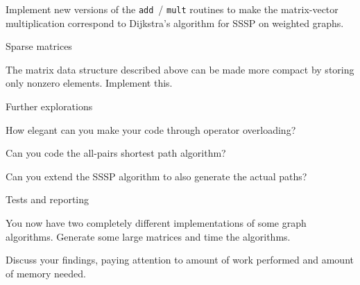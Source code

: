 \begin{exercise}
  Implement new versions of the  \lstinline{add}~/ \lstinline{mult} routines
  to make the matrix-vector multiplication correspond to Dijkstra's algorithm
  for \ac{SSSP} on weighted graphs.
\end{exercise}

 {Sparse matrices}

The matrix data structure described above can be made
more compact by storing only nonzero elements.
Implement this.

 {Further explorations}

How elegant can you make your code through operator overloading?

Can you code the all-pairs shortest path algorithm?

Can you extend the \ac{SSSP} algorithm to also generate the actual paths?

 {Tests and reporting}

You now have two completely different implementations
of some graph algorithms.
Generate some large matrices and time the algorithms.

Discuss your findings, paying attention to amount of work performed and
amount of memory needed.

